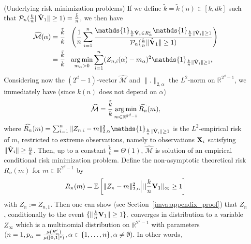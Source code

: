 \begin{remark}{(\sc Underlying risk minimization problems)}
If we define $\tilde k = \tilde k(n) \in [k, dk]$ such that $\mathcal{P}_n(\frac{k}{n} \| \hat{\mathbf V}_1 \| \ge 1) = \frac{\tilde k}{
   n}$, we then have  
\begin{align*}
\widehat{\mathcal{M}}(\alpha) &= \frac{\tilde k}{k} ~~ \left( \frac{1}{n} \sum_{i=1}^n \frac{\mathds{1}_{\frac{k}{n} \hat{\mb V}_i \in R_\alpha^\epsilon} \mathds{1}_{\frac{k}{n} \| \hat{\mb V}_i \| \ge 1}}{ \mathcal{P}_n(\frac{k}{n} \| \hat{\mb V}_1 \| \ge 1)}\right) \\
&= \frac{\tilde k}{k} ~~ \argmin_{m_\alpha > 0} \sum_{i=1}^n (Z_{n,i}(\alpha) - m_\alpha)^2 \mathds{1}_{\frac{k}{n} \| \hat{\mb V}_i \| \ge 1},
\end{align*}
Considering now the $(2^d -1)$-vector $\widehat{\mathcal{M}}$ and $\|.\|_{2, \alpha}$ the $L^2$-norm on $\mathbb{R}^{2^d-1}$, we immediately have (since $k(n)$ does not depend on $\alpha$)
\begin{align}
\label{jmva:eq:optim_pb}
\widehat{\mathcal{M}} = \frac{\tilde k}{k} \argmin_{m \in \mathbb{R}^{2^d-1}} \widehat{R_n}(m),
\end{align}
where $\widehat{R_n}(m) = \sum_{i=1}^n \|Z_{n,i} - m\|_{2,\alpha}^2 \mathds{1}_{\frac{k}{n} \| \hat{\mb V}_i \| \ge 1}$ is the $L^2$-empirical risk of $m$, restricted to extreme observations, namely to observations $\mathbf X_i$ satisfying $\| \hat{\mathbf V}_i \| \ge \frac{n}{k}$. Then, up to a constant $\frac{\tilde k}{k} = \Theta(1)$, $\widehat{\mathcal{M}}$ is solution of an empirical conditional risk minimization problem. 
\noindent
Define the non-asymptotic theoretical risk $R_n(m)$ for $m \in \mathbb{R}^{2^d-1}$ by $$R_n(m) = \mathbb{E}\left[ \|Z_n - m\|_{2,\alpha}^2  \Big| \|\frac{k}{n} \mathbf V_1\|_\infty \ge 1\right]$$
with $Z_n:=Z_{n,1}$. Then one can show (see Section~\ref{jmva:appendix_proof}) that $Z_n$, conditionally to the event $\{\|\frac{k}{n} \mathbf V_1\| \ge 1\}$, converges in distribution to a variable $Z_\infty$ which is a multinomial distribution on $\mathbb{R}^{2^d-1}$ with parameters $(n=1, p_\alpha = \frac{\mu(R_\alpha^\epsilon)}{\mu([\mathbf 0, \mathbf 1]^c)}, \alpha \in \{1,\ldots,n\}, \alpha \neq \emptyset)$. In other words, 

\end{remark}
